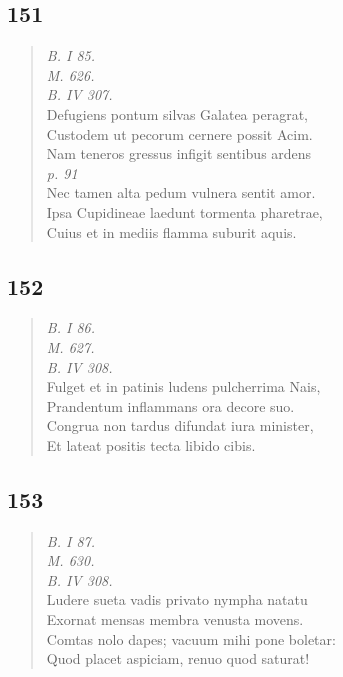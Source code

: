 \documentclass[11pt, a4paper]{report}
\begin{document}
            \subsection*{151}
      \begin{verse}
      \textit{B. I 85.} \\ \textit{M. 626.} \\ \textit{B. IV 307.} \\ Defugiens pontum silvas Galatea peragrat, \\ Custodem ut pecorum cernere possit Acim. \\ Nam teneros gressus infigit sentibus ardens \\ \textit{p. 91} \\ Nec tamen alta pedum vulnera sentit amor. \\ Ipsa Cupidineae laedunt tormenta pharetrae, \\ Cuius et in mediis flamma suburit aquis. \\ 
      \end{verse}
  
            \subsection*{152}
      \begin{verse}
      \textit{B. I 86.} \\ \textit{M. 627.} \\ \textit{B. IV 308.} \\ Fulget et in patinis ludens pulcherrima Nais, \\ Prandentum inflammans ora decore suo. \\ Congrua non tardus difundat iura minister, \\ Et lateat positis tecta libido cibis. \\ 
      \end{verse}
  
            \subsection*{153}
      \begin{verse}
      \textit{B. I 87.} \\ \textit{M. 630.} \\ \textit{B. IV 308.} \\ Ludere sueta vadis privato nympha natatu \\ Exornat mensas membra venusta movens. \\ Comtas nolo dapes; vacuum mihi pone boletar: \\ Quod placet aspiciam, renuo quod saturat! \\ 
      \end{verse}
  
\end{document}
